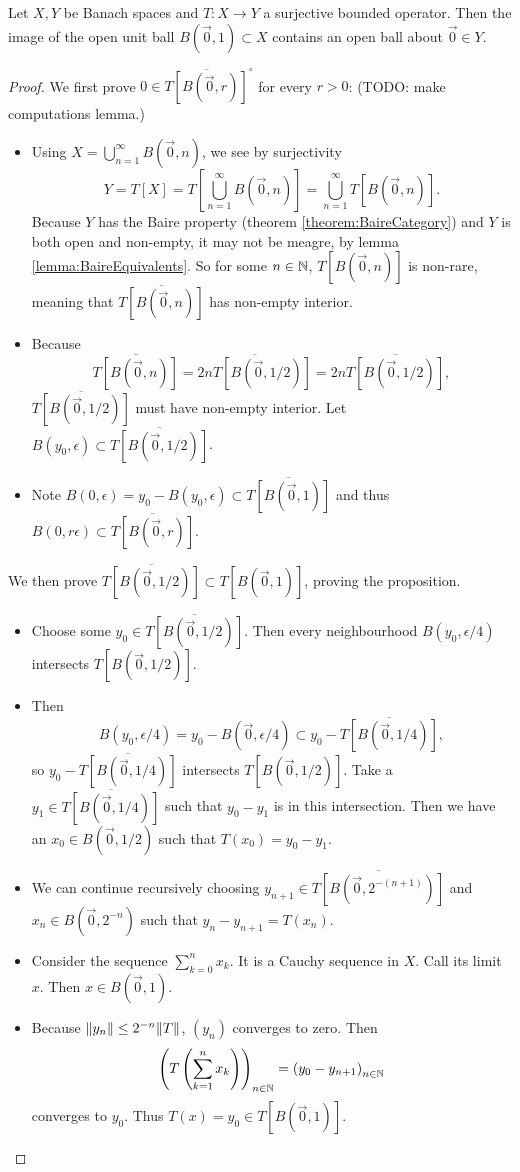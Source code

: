 \begin{proposition} \label{prop:openUnitBall}
Let $X,Y$ be Banach spaces and $T:X\to Y$ a surjective bounded operator.  Then the image of the open unit ball $B(\vec{0},1)\subset X$ contains an open ball about $\vec{0}\in Y$.
\end{proposition}
\begin{proof}
We first prove $0\in \overline{T[B(\vec{0},r)]}^\circ$ for every $r>0$: (TODO: make computations lemma.)
\begin{itemize}
\item Using $X = \bigcup_{n=1}^\infty B(\vec{0},n)$, we see by surjectivity
\[ Y = T[X] = T\left[\bigcup_{n=1}^\infty B(\vec{0},n)\right] = \bigcup_{n=1}^\infty T[B(\vec{0},n)]. \]
Because $Y$ has the Baire property (theorem \ref{theorem:BaireCategory}) and $Y$ is both open and non-empty, it may not be meagre, by lemma \ref{lemma:BaireEquivalents}. So for some $n\in\mathbb{N}$, $T[B(\vec{0},n)]$ is non-rare, meaning that $\overline{T[B(\vec{0},n)]}$ has non-empty interior.
\item Because
\[ \overline{T[B(\vec{0},n)]} = \overline{2nT[B(\vec{0},1/2)]} = 2n\overline{T[B(\vec{0},1/2)]}, \]
$\overline{T[B(\vec{0},1/2)]}$ must have non-empty interior. Let $B(y_0,\epsilon)\subset \overline{T[B(\vec{0},1/2)]}$.
\item Note $B(0,\epsilon) = y_0 - B(y_0,\epsilon) \subset \overline{T[B(\vec{0},1)]}$ and thus $B(0,r\epsilon) \subset \overline{T[B(\vec{0},r)]}$.
\end{itemize}
We then prove $\overline{T[B(\vec{0},1/2)]} \subset T[B(\vec{0}, 1)]$, proving the proposition.
\begin{itemize}
\item Choose some $y_0\in \overline{T[B(\vec{0},1/2)]}$. Then every neighbourhood $B(y_0,\epsilon/4)$ intersects $T[B(\vec{0},1/2)]$.
\item Then
\[ B(y_0,\epsilon/4) = y_0 - B(\vec{0},\epsilon/4) \subset y_0 - \overline{T[B(\vec{0},1/4)]}, \]
so $y_0 - \overline{T[B(\vec{0},1/4)]}$ intersects $T[B(\vec{0},1/2)]$. Take a $y_1 \in \overline{T[B(\vec{0},1/4)]}$ such that $y_0-y_1$ is in this intersection. Then we have an $x_0\in B(\vec{0},1/2)$ such that $T(x_0) = y_0-y_1$.
\item We can continue recursively choosing $y_{n+1}\in \overline{T[B(\vec{0}, 2^{-(n+1)})]}$ and $x_n \in B(\vec{0}, 2^{-n})$ such that $y_n-y_{n+1} = T(x_n)$.
\item Consider the sequence $\sum_{k=0}^nx_k$. It is a Cauchy sequence in $X$. Call its limit $x$. Then $x\in B(\vec{0},1)$.
\item Because $\lVert y_n\rVert\leq 2^{-n}\lVert T\rVert$, $(y_n)$ converges to zero. Then
\[ \left( T\left(\sum^n_{k=1}x_k\right) \right)_{n\in\mathbb{N}} = \left( y_0-y_{n+1} \right)_{n\in\mathbb{N}} \]
converges to $y_0$. Thus $T(x) = y_0 \in T[B(\vec{0},1)]$.
\end{itemize}
\end{proof}

